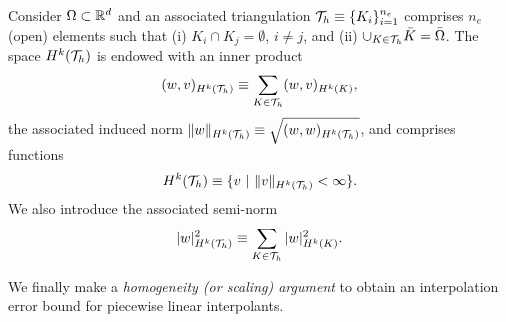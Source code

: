 \begin{definition}
  \label{def:th_broken_Hk}
  Consider $\Omega \subset \mathbb{R}^d$ and an associated triangulation $\mathcal{T}_h \equiv \{ K_i \}_{i=1}^{n_e}$ comprises $n_e$ (open) elements such that (i) $K_i \cap K_j = \emptyset$, $i \neq j$, and (ii) $\cup_{K \in \mathcal{T}_h} \bar K = \bar \Omega$.  The space $H^k(\mathcal{T}_h)$ is endowed with an inner product
  \begin{equation*}
    (w,v)_{H^k(\mathcal{T}_h)} \equiv \sum_{K \in \mathcal{T}_h} (w,v)_{H^k(K)},
  \end{equation*}
  the associated induced norm $\| w \|_{H^k(\mathcal{T}_h)} \equiv \sqrt{(w,w)_{H^k(\mathcal{T}_h)}}$, and comprises functions
  \begin{equation*}
    H^k(\mathcal{T}_h) \equiv \{ v \ | \ \| v \|_{H^k(\mathcal{T}_h)} < \infty \}.
  \end{equation*}
  We also introduce the associated semi-norm
  \begin{equation*}
    | w |_{H^k(\mathcal{T}_h)}^2 \equiv \sum_{K \in \mathcal{T}_h} | w |_{H^k(K)}^2.
  \end{equation*}
\end{definition}
We finally make a \emph{homogeneity (or scaling) argument} to obtain an interpolation error bound for piecewise linear interpolants. %
